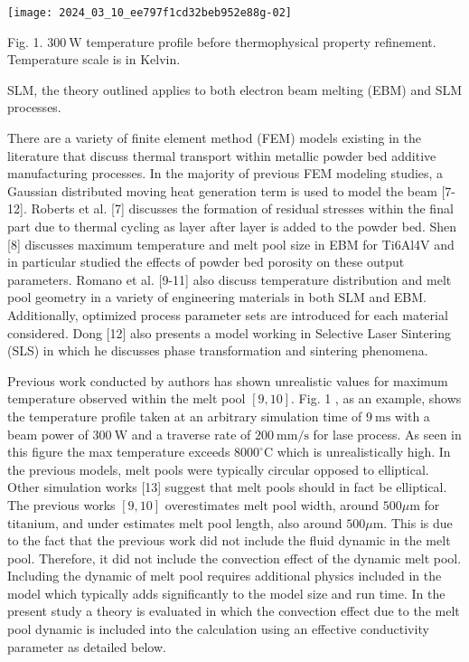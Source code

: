 \documentclass[10pt]{article}
\begin{document}
\begin{center}
\texttt{[image: 2024\_03\_10\_ee797f1cd32beb952e88g-02]}
\end{center}

Fig. 1. $300 \mathrm{~W}$ temperature profile before thermophysical property refinement. Temperature scale is in Kelvin.

SLM, the theory outlined applies to both electron beam melting (EBM) and SLM processes.

There are a variety of finite element method (FEM) models existing in the literature that discuss thermal transport within metallic powder bed additive manufacturing processes. In the majority of previous FEM modeling studies, a Gaussian distributed moving heat generation term is used to model the beam [7-12]. Roberts et al. [7] discusses the formation of residual stresses within the final part due to thermal cycling as layer after layer is added to the powder bed. Shen [8] discusses maximum temperature and melt pool size in EBM for Ti6Al4V and in particular studied the effects of powder bed porosity on these output parameters. Romano et al. [9-11] also discuss temperature distribution and melt pool geometry in a variety of engineering materials in both SLM and EBM. Additionally, optimized process parameter sets are introduced for each material considered. Dong [12] also presents a model working in Selective Laser Sintering (SLS) in which he discusses phase transformation and sintering phenomena.

Previous work conducted by authors has shown unrealistic values for maximum temperature observed within the melt pool $[9,10]$. Fig. 1 , as an example, shows the temperature profile taken at an arbitrary simulation time of $9 \mathrm{~ms}$ with a beam power of $300 \mathrm{~W}$ and a traverse rate of $200 \mathrm{~mm} / \mathrm{s}$ for lase process. As seen in this figure the max temperature exceeds $8000^{\circ} \mathrm{C}$ which is unrealistically high. In the previous models, melt pools were typically circular opposed to elliptical. Other simulation works [13] suggest that melt pools should in fact be elliptical. The previous works $[9,10]$ overestimates melt pool width, around $500 \mu \mathrm{m}$ for titanium, and under estimates melt pool length, also around $500 \mu \mathrm{m}$. This is due to the fact that the previous work did not include the fluid dynamic in the melt pool. Therefore, it did not include the convection effect of the dynamic melt pool. Including the dynamic of melt pool requires additional physics included in the model which typically adds significantly to the model size and run time. In the present study a theory is evaluated in which the convection effect due to the melt pool dynamic is included into the calculation using an effective conductivity parameter as detailed below.
\end{document}
